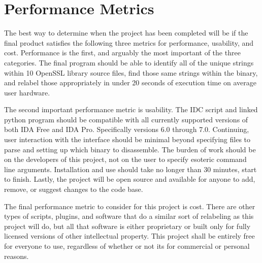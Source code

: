 \documentclass[10pt, draftclsnofoot, letterpaper, margin=.75in, onecolumn]{IEEEtran}
\begin{document}
\section{Performance Metrics}
The best way to determine when the project has been completed will be if the final product satisfies the following three metrics for performance, usability, and cost. Performance is the first, and arguably the most important of the three categories. The final program should be able to identify all of the unique strings within 10 OpenSSL library source files, find those same strings within the binary, and relabel those appropriately in under 20 seconds of execution time on average user hardware.\\

\par The second important performance metric is usability. The IDC script and linked python program should be compatible with all currently supported versions of both IDA Free and IDA Pro. Specifically versions 6.0 through 7.0. Continuing, user interaction with the interface should be minimal beyond specifying files to parse and setting up which binary to disassemble. The burden of work should be on the developers of this project, not on the user to specify esoteric command line arguments. Installation and use should take no longer than 30 minutes, start to finish. Lastly, the project will be open source and available for anyone to add, remove, or suggest changes to the code base.\\

\par The final performance metric to consider for this project is cost. There are other types of scripts, plugins, and software that do a similar sort of relabeling as this project will do, but all that software is either proprietary or built only for fully licensed versions of other intellectual property. This project shall be entirely free for everyone to use, regardless of whether or not its for commercial or personal reasons.
\end{document}

